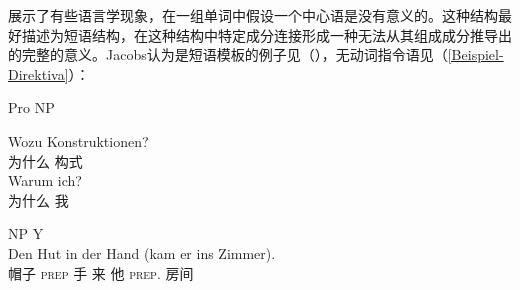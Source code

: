 \begin{exe}
\begin{xlist}[iv.]
\begin{exe}
\begin{xlist}[iv.]
 \citet{Jacobs2008a}展示了有些语言学现象，在一组单词中假设一个中心语是没有意义的。这种结构最好描述为短语结构，在这种结构中特定成分连接形成一种无法从其组成成分推导出的完整的意义。Jacobs认为是短语模板的例子见（），无动词指令语见（\ref{Beispiel-Direktiva}）：
\begin{exe}
\ex Pro NP
\begin{xlist}
\ex
\gll  Wozu Konstruktionen?\\
      为什么 构式\\
\ex 
\gll Warum ich?\\
     为什么 我\\
\end{xlist}
\end{exe}
\ea
NP Y\\
\gll Den Hut in der Hand (kam er ins Zimmer).\\
      帽子 \textsc{prep}  手 来 他 \textsc{prep}. 房间\\


\end{xlist}
\end{exe}
\end{xlist}
\end{exe}
